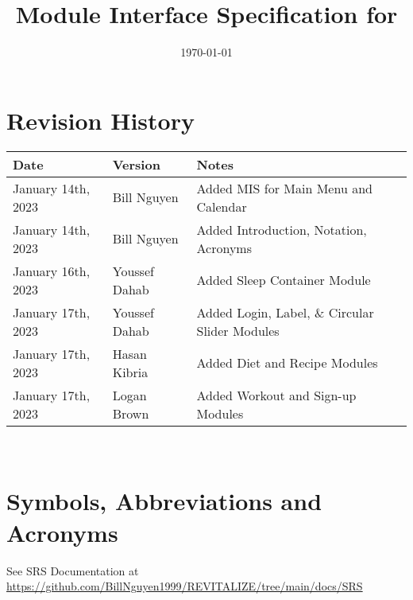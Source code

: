 \documentclass[12pt, titlepage]{article}
\begin{document}
\title{Module Interface Specification for \progname{}}

\author{\authname}

\date{\today}

\maketitle


\section{Revision History}

\begin{tabularx}{\textwidth}{p{3cm}p{2cm}X}
	\toprule {\bf Date} & {\bf Version} & {\bf Notes}\\
	\midrule
	January 14th, 2023 & Bill Nguyen  & Added MIS for Main Menu and Calendar\\
	January 14th, 2023 & Bill Nguyen  & Added Introduction, Notation, Acronyms\\
	January 16th, 2023 & Youssef Dahab & Added Sleep Container Module\\
	January 17th, 2023 & Youssef Dahab & Added Login, Label, \& Circular Slider Modules\\
	January 17th, 2023 & Hasan Kibria & Added Diet and Recipe Modules\\
	January 17th, 2023 & Logan Brown & Added Workout and Sign-up Modules\\
	\bottomrule
\end{tabularx}

~\newpage

\section{Symbols, Abbreviations and Acronyms}

See SRS Documentation at \url{https://github.com/BillNguyen1999/REVITALIZE/tree/main/docs/SRS}
\end{document}
